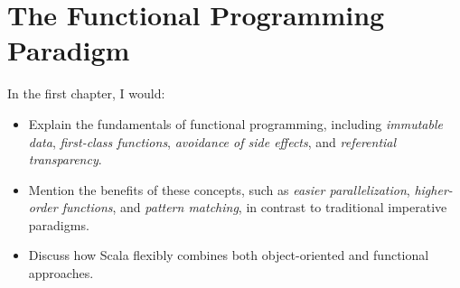 \chapter{The Functional Programming Paradigm}

In the first chapter, I would:

\begin{itemize}
\item Explain the fundamentals of functional programming, including \emph{immutable data}, \emph{first-class functions}, \emph{avoidance of side effects}, and \emph{referential transparency}. 
\item Mention the benefits of these concepts, such as \emph{easier parallelization}, \emph{higher-order functions}, and \emph{pattern matching}, in contrast to traditional imperative paradigms.
\item Discuss how Scala flexibly combines both object-oriented and functional approaches.
\end{itemize}